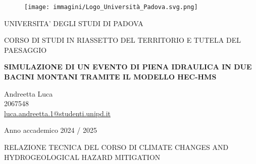 \begin{figure}[H]\centering
    \texttt{[image: immagini/Logo\_Università\_Padova.svg.png]}
\end{figure}
\begin{center}

{\Large UNIVERSITA' DEGLI STUDI DI PADOVA }\\
  \vspace{0.4 cm}
  
{\Large CORSO DI STUDI IN RIASSETTO DEL TERRITORIO E TUTELA DEL PAESAGGIO } \\ 
    \vspace{0.4 cm}
    
    \vspace{1 cm}

{\huge \textbf{SIMULAZIONE DI UN EVENTO DI PIENA IDRAULICA IN DUE BACINI MONTANI TRAMITE IL MODELLO HEC-HMS} }
\vspace{0.75 cm}

\normalsize
\end{center}

{\Large \begin{center}
Andreetta Luca \\
2067548 \\
\href{mailto:luca.andreetta.1@studenti.unipd.it}{luca.andreetta.1@studenti.unipd.it}
\end{center}
\vspace{1 cm}

\thispagestyle{empty}
\begin{center}
	Anno accademico 2024 / 2025
\end{center}

\vspace{2 cm}
\begin{center}
    RELAZIONE TECNICA DEL CORSO DI CLIMATE CHANGES AND HYDROGEOLOGICAL HAZARD MITIGATION 
\end{center}
}

\newpage